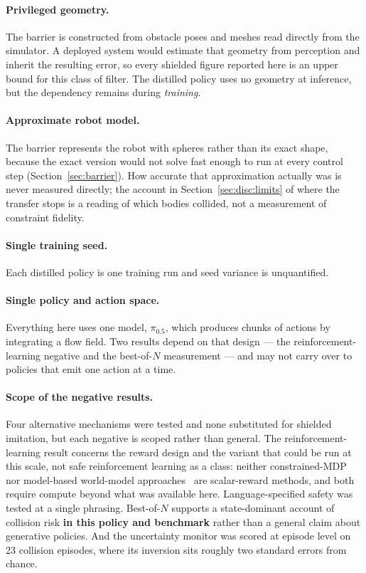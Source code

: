 \paragraph{Privileged geometry.}
The barrier is constructed from obstacle poses and meshes read directly from the simulator. A
deployed system would estimate that geometry from perception and inherit the resulting error, so
every shielded figure reported here is an upper bound for this class of filter. The distilled
policy uses no geometry at inference, but the dependency remains during \emph{training}.

\paragraph{Approximate robot model.}
The barrier represents the robot with spheres rather than its exact shape, because the exact
version would not solve fast enough to run at every control step (Section~\ref{sec:barrier}). How
accurate that approximation actually was is never measured directly; the account in
Section~\ref{sec:disc:limits} of where the transfer stops is a reading of which bodies collided,
not a measurement of constraint fidelity.

\paragraph{Single training seed.}
Each distilled policy is one training run and seed variance is unquantified.

\paragraph{Single policy and action space.}
Everything here uses one model, $\pi_{0.5}$, which produces chunks of actions by integrating a
flow field. Two results depend on that design --- the reinforcement-learning negative and the
best-of-$N$ measurement --- and may not carry over to policies that emit one action at a time.

\paragraph{Scope of the negative results.}
Four alternative mechanisms were tested and none substituted for shielded imitation, but each
negative is scoped rather than general. The reinforcement-learning result concerns the reward
design and the variant that could be run at this scale, not safe reinforcement learning as a
class: neither constrained-MDP~\cite{safevla} nor model-based world-model
approaches~\cite{safedojo} are scalar-reward methods, and both require compute beyond what was
available here. Language-specified safety was tested at a single phrasing. Best-of-$N$ supports a
state-dominant account of collision risk \textbf{in this policy and benchmark} rather than a
general claim about generative policies. And the uncertainty monitor was scored at episode level on
23 collision episodes, where its inversion sits roughly two standard errors from chance.

